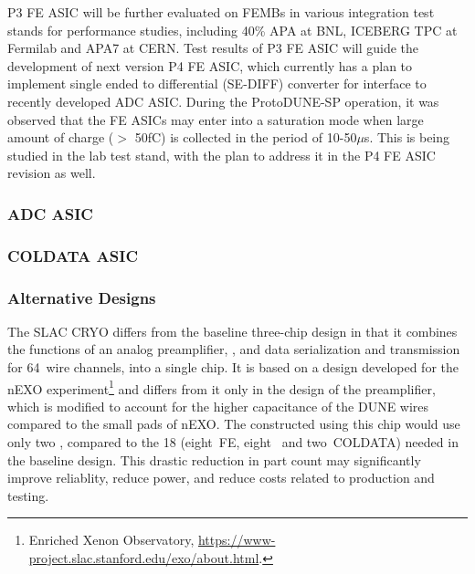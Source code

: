 P3 FE ASIC will be further evaluated on FEMBs in various integration test stands for performance studies, including 40\% APA at BNL, ICEBERG TPC at Fermilab and APA7 at CERN. Test results of P3 FE ASIC will guide the development of next version P4 FE ASIC, which currently has a plan to implement single ended to differential (SE-DIFF) converter for interface to recently developed ADC ASIC. During the ProtoDUNE-SP operation, it was observed that the FE ASICs may enter into a saturation mode when large amount of charge ($>$ 50fC) is collected in the period of 10-50$\mu$s. This is being studied in the lab test stand, with the plan to address it in the P4 FE ASIC revision as well.

\subsubsection{ADC ASIC}
\label{sec:fdsp-tpcelec-design-femb-adc}

\subsubsection{COLDATA ASIC}
\label{sec:fdsp-tpcelec-design-femb-coldata}

\subsubsection{Alternative Designs}
\label{sec:fdsp-tpcelec-design-femb-alt}

\label{sec:fdsp-tpcelec-design-femb-alt-cryo}

The SLAC CRYO  differs from the baseline three-chip design in that it combines the functions of an analog preamplifier, , and data serialization and transmission for \num{64}~wire channels, into a single chip.
It is based on a design developed for the nEXO experiment\footnote{Enriched Xenon Observatory, \url{https://www-project.slac.stanford.edu/exo/about.html}.} and differs from it only in the design of the preamplifier, which is modified to account for the higher capacitance of the DUNE  wires compared to the small pads of nEXO.
The  constructed using this chip would use only two , compared to the \num{18} (eight~FE, eight~ and two~COLDATA) needed in the baseline design.
This drastic reduction in part count may significantly improve  reliablity, reduce power, and reduce costs related to production and testing. 

